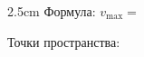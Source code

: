 
\begin{answerboxpart}{2.5cm}
Формула: \(v_\mathrm{max}=\)

\bigskip

Точки пространства:
\end{answerboxpart}

